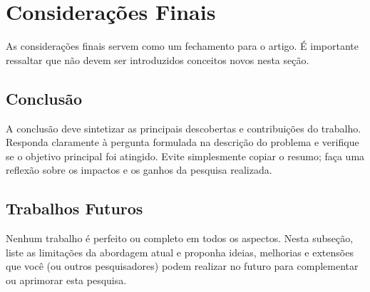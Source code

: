 \section{Considerações Finais}
\label{sec:consideracoes_finais}

As considerações finais servem como um fechamento para o artigo. É importante ressaltar que não devem ser introduzidos conceitos novos nesta seção.

\subsection{Conclusão}
A conclusão deve sintetizar as principais descobertas e contribuições do trabalho. Responda claramente à pergunta formulada na descrição do problema e verifique se o objetivo principal foi atingido. Evite simplesmente copiar o resumo; faça uma reflexão sobre os impactos e os ganhos da pesquisa realizada.

\subsection{Trabalhos Futuros}
Nenhum trabalho é perfeito ou completo em todos os aspectos. Nesta subseção, liste as limitações da abordagem atual e proponha ideias, melhorias e extensões que você (ou outros pesquisadores) podem realizar no futuro para complementar ou aprimorar esta pesquisa.
